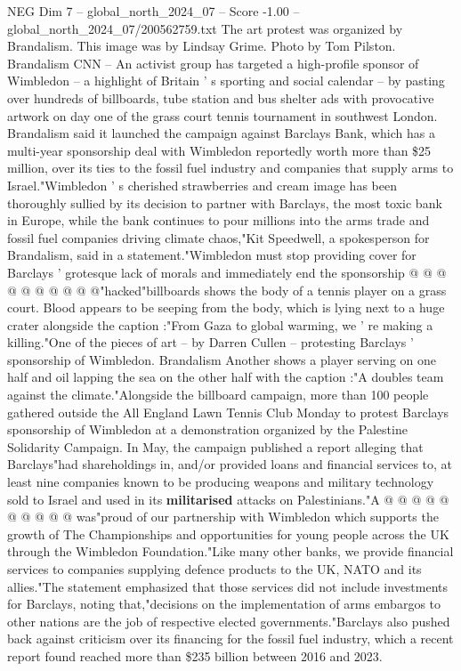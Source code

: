 \begin{textsample}{NEG Dim 7 – global\_north\_2024\_07 – Score -1.00 – global\_north\_2024\_07/200562759.txt}  \label{ex:f7_neg_413}
The art protest was organized by Brandalism.
This image was by Lindsay Grime.
Photo by Tom Pilston.
Brandalism CNN -- An activist group has targeted a high-profile sponsor of Wimbledon -- a highlight of Britain ' s sporting and social calendar -- by pasting over hundreds of billboards, tube station and bus shelter ads with provocative artwork on day one of the grass court tennis tournament in southwest London.
Brandalism said it launched the campaign against Barclays Bank, which has a multi-year sponsorship deal with Wimbledon reportedly worth more than \$25 million, over its ties to the fossil fuel industry and companies that supply arms to Israel."Wimbledon ' s cherished strawberries and cream image has been thoroughly sullied by its decision to partner with Barclays, the most toxic bank in Europe, while the bank continues to pour millions into the arms trade and fossil fuel companies driving climate chaos,"Kit Speedwell, a spokesperson for Brandalism, said in a statement."Wimbledon must stop providing cover for Barclays ' grotesque lack of morals and immediately end the sponsorship @ @ @ @ @ @ @ @ @ @"hacked"billboards shows the body of a tennis player on a grass court.
Blood appears to be seeping from the body, which is lying next to a huge crater alongside the caption :"From Gaza to global warming, we ' re making a killing."One of the pieces of art -- by Darren Cullen -- protesting Barclays ' sponsorship of Wimbledon.
Brandalism Another shows a player serving on one half and oil lapping the sea on the other half with the caption :"A doubles team against the climate."Alongside the billboard campaign, more than 100 people gathered outside the All England Lawn Tennis Club Monday to protest Barclays sponsorship of Wimbledon at a demonstration organized by the Palestine Solidarity Campaign.
In May, the campaign published a report alleging that Barclays"had shareholdings in, and/or provided loans and financial services to, at least nine companies known to be producing weapons and military technology sold to Israel and used in its \textbf{militarised} attacks on Palestinians."A @ @ @ @ @ @ @ @ @ @ was"proud of our partnership with Wimbledon which supports the growth of The Championships and opportunities for young people across the UK through the Wimbledon Foundation."Like many other banks, we provide financial services to companies supplying defence products to the UK, NATO and its allies."The statement emphasized that those services did not include investments for Barclays, noting that,"decisions on the implementation of arms embargos to other nations are the job of respective elected governments."Barclays also pushed back against criticism over its financing for the fossil fuel industry, which a recent report found reached more than \$235 billion between 2016 and 2023.

\end{textsample}

